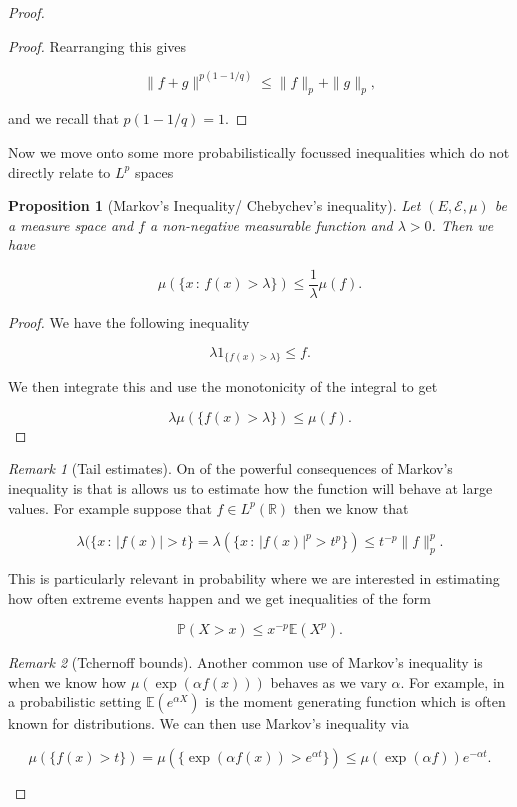 \documentclass[
]{book}
\newtheorem{proposition}{Proposition}[chapter]
\theoremstyle{definition}
\theoremstyle{definition}
\theoremstyle{definition}
\theoremstyle{definition}
\theoremstyle{remark}
\newtheorem*{remark}{Remark}
\begin{document}
\begin{proof}
\begin{proof}
Rearranging this gives

\[ \|f+g\|^{p(1-1/q)} \leq \|f\|_p + \|g\|_p, \]

and we recall that \(p(1-1/q) = 1\).
\end{proof}

Now we move onto some more probabilistically focussed inequalities which do not directly relate to \(L^p\) spaces

\begin{proposition}[Markov's Inequality/ Chebychev's inequality]
Let \((E, \mathcal{E}, \mu)\) be a measure space and \(f\) a non-negative measurable function and \(\lambda>0\). Then we have

\[ \mu(\{ x\,:\, f(x) > \lambda\}) \leq \frac{1}{\lambda} \mu(f). \]
\end{proposition}

\begin{proof}
We have the following inequality

\[ \lambda 1_{\{ f(x) > \lambda\}} \leq f. \]

We then integrate this and use the monotonicity of the integral to get

\[ \lambda \mu(\{ f(x) > \lambda\}) \leq \mu(f). \]
\end{proof}

\begin{remark}[Tail estimates]
On of the powerful consequences of Markov's inequality is that is allows us to estimate how the function will behave at large values. For example suppose that \(f \in L^p(\mathbb{R})\) then we know that

\[ \lambda(\{ x\, :\, |f(x)| > t \} = \lambda (\{ x\,:\, |f(x)|^p > t^p\}) \leq t^{-p} \|f\|_p^p.\]

This is particularly relevant in probability where we are interested in estimating how often extreme events happen and we get inequalities of the form

\[ \mathbb{P}(X > x) \leq x^{-p}\mathbb{E}(X^p). \]
\end{remark}

\begin{remark}[Tchernoff bounds]
Another common use of Markov's inequality is when we know how \(\mu( \exp( \alpha f(x)))\) behaves as we vary \(\alpha\). For example, in a probabilistic setting \(\mathbb{E}(e^{\alpha X})\) is the moment generating function which is often known for distributions. We can then use Markov's inequality via

\[ \mu(\{f(x)> t\}) = \mu( \{ \exp(\alpha f(x)) > e^{\alpha t} \} ) \leq \mu(\exp(\alpha f)) e^{-\alpha t}. \]


\end{remark}
\end{proof}
\end{document}
